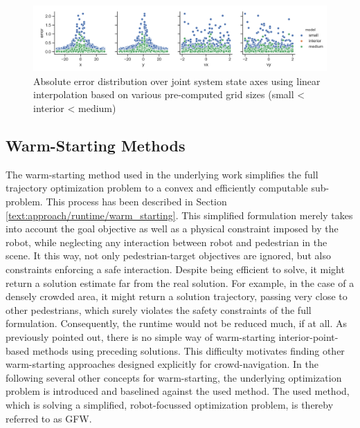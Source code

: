 \begin{figure}[!ht]
\begin{center}
\includegraphics[width=\imgwidth]{images/hj_hist_linear.png}
\caption{Absolute error distribution over joint system state axes using linear interpolation based on various pre-computed grid sizes (small < interior < medium)}
\label{img:hj_approx_hist}
\end{center}
\end{figure}

\subsection{Warm-Starting Methods}
The warm-starting method used in the underlying work simplifies the full trajectory optimization problem to a convex and efficiently computable sub-problem. This process has been described in Section \ref{text:approach/runtime/warm_starting}. This simplified formulation merely takes into account the goal objective as well as a physical constraint imposed by the robot, while neglecting any interaction between robot and pedestrian in the scene. It this way, not only pedestrian-target objectives are ignored, but also constraints enforcing a safe interaction. Despite being efficient to solve, it might return a solution estimate far from the real solution. For example, in the case of a densely crowded area, it might return a solution trajectory, passing very close to other pedestrians, which surely violates the safety constraints of the full formulation. Consequently, the runtime would not be reduced much, if at all. 
\newline
As previously pointed out, there is no simple way of warm-starting interior-point-based methods using preceding solutions. This difficulty motivates finding other warm-starting approaches designed explicitly for crowd-navigation. In the following several other concepts for warm-starting, the underlying optimization problem is introduced and baselined against the used method. The used method, which is solving a simplified, robot-focussed optimization problem, is thereby referred to as \ac{GFW}.

